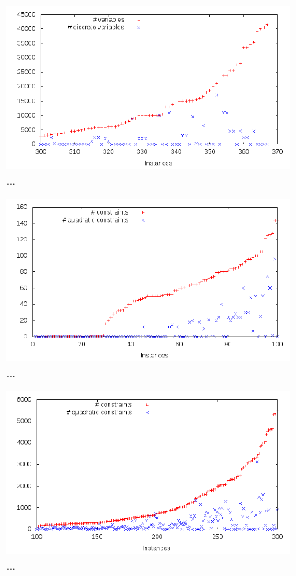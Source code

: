 \begin{figure}\centering
  \includegraphics[width=0.85\textwidth]{pic_var_big.png}
  \caption{...\label{fig:2}}
\end{figure}

\begin{figure}\centering
  \includegraphics[width=0.85\textwidth]{pic_constr_small.png}
  \caption{...\label{fig:5}}
\end{figure}

\begin{figure}\centering
  \includegraphics[width=0.85\textwidth]{pic_constr_medium.png}
  \caption{...\label{fig:6}}
\end{figure}

